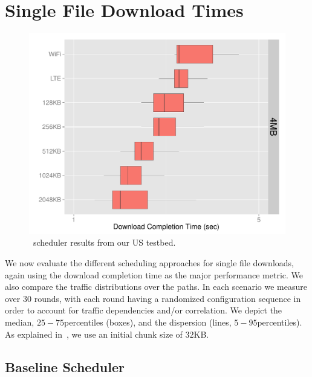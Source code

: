 \clearpage
\section{Single File Download Times}
\label{sec:evaluation-single-file}

\begin{figure}[!htb]
    \begin{minipage}[t]{0.8\linewidth}
	\begin{center}
        \includegraphics[width=\linewidth]{Figures/baseline-scheduler-us-testbed.pdf}
		\caption{\label{fig:evaluation-baseline-us}\algbase~scheduler results from our US testbed.}
    \end{center}
    \end{minipage}
\vspace*{-0.3cm}
\end{figure}

We now evaluate the different scheduling approaches for single file downloads, again using the download completion time as the major performance metric. 
We also compare the traffic distributions over the paths. 
In each scenario we measure over $30$ rounds, with each round having a randomized configuration sequence in order to account for traffic dependencies and/or correlation. 
We depict the median, $25-75$\perc percentiles (boxes), and the dispersion (lines, $5-95$\perc percentiles). 
As explained in~, we use an initial chunk size of $32$KB.

\subsection{Baseline Scheduler}
\label{sec:evaluation-baseline}

